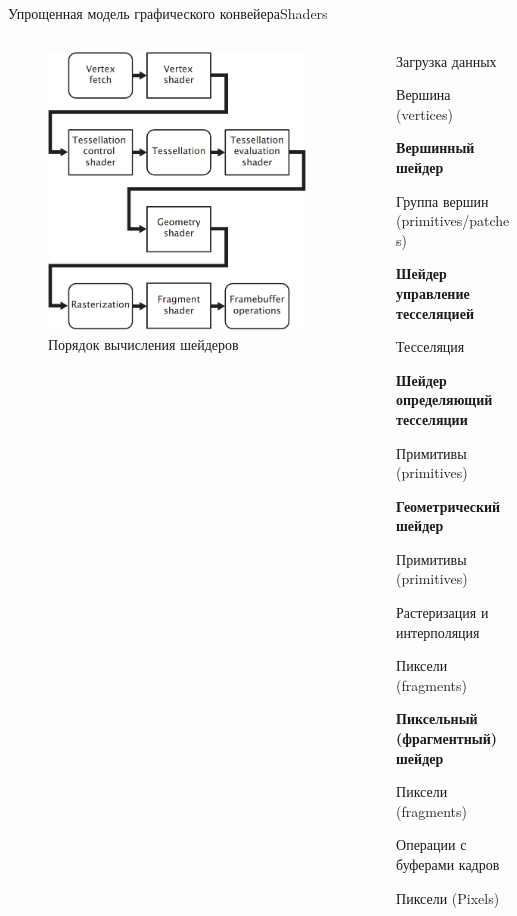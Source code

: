 \documentclass{beamer}
\begin{document}
\begin{frame}{Упрощенная модель графического конвейера}{Shaders}
	\begin{columns}
		\begin{column}{0.5\textwidth}
			\begin{figure} 
				\includegraphics[width=0.9\textwidth]{images/Simplified_model_of_the_graphics_pipeline.png}
				\caption {Порядок вычисления шейдеров}
			\end{figure}
		\end{column}
		\begin{column}{0.5\textwidth}
			
			{\footnotesize
			
			Загрузка данных
			
			
			{\hfill Вершина (vertices)}
			
			\textbf{Вершинный шейдер}
			
			{\hfill Группа вершин (primitives/patches)}
			
			\textbf{Шейдер управление тесселяцией}
			
			Тесселяция
			
			\textbf{Шейдер определяющий тесселяции}
			
			{\hfill Примитивы (primitives)}
			
			\textbf{Геометрический шейдер}
			
			{\hfill Примитивы (primitives)}
			
			Растеризация и интерполяция
			
			{\hfill Пиксели (fragments)}
			
			\textbf{Пиксельный (фрагментный) шейдер}
			
			{\hfill Пиксели (fragments)}
			
			Операции с буферами кадров
			
			{\hfill Пиксели (Pixels)}
		}
		\end{column}
	\end{columns}
	

\end{frame}
\end{document}
